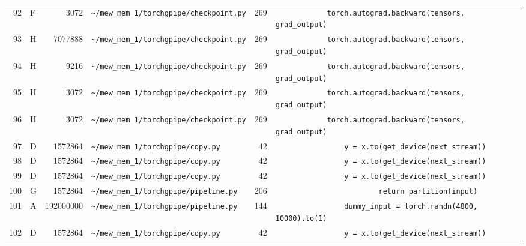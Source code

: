 \documentclass{article}
\begin{document}
\begin{longtable}{r l r p{6.5cm} r p{7.0cm}}
92 & F & 3072 & \lstinline|~/mew_mem_1/torchgpipe/checkpoint.py| & 269 & \lstinline|            torch.autograd.backward(tensors, grad_output)| \\
93 & H & 7077888 & \lstinline|~/mew_mem_1/torchgpipe/checkpoint.py| & 269 & \lstinline|            torch.autograd.backward(tensors, grad_output)| \\
94 & H & 9216 & \lstinline|~/mew_mem_1/torchgpipe/checkpoint.py| & 269 & \lstinline|            torch.autograd.backward(tensors, grad_output)| \\
95 & H & 3072 & \lstinline|~/mew_mem_1/torchgpipe/checkpoint.py| & 269 & \lstinline|            torch.autograd.backward(tensors, grad_output)| \\
96 & H & 3072 & \lstinline|~/mew_mem_1/torchgpipe/checkpoint.py| & 269 & \lstinline|            torch.autograd.backward(tensors, grad_output)| \\
97 & D & 1572864 & \lstinline|~/mew_mem_1/torchgpipe/copy.py| & 42 & \lstinline|                y = x.to(get_device(next_stream))| \\
98 & D & 1572864 & \lstinline|~/mew_mem_1/torchgpipe/copy.py| & 42 & \lstinline|                y = x.to(get_device(next_stream))| \\
99 & D & 1572864 & \lstinline|~/mew_mem_1/torchgpipe/copy.py| & 42 & \lstinline|                y = x.to(get_device(next_stream))| \\
100 & G & 1572864 & \lstinline|~/mew_mem_1/torchgpipe/pipeline.py| & 206 & \lstinline|                        return partition(input)| \\
101 & A & 192000000 & \lstinline|~/mew_mem_1/torchgpipe/pipeline.py| & 144 & \lstinline|                dummy_input = torch.randn(4800, 10000).to(1)| \\
102 & D & 1572864 & \lstinline|~/mew_mem_1/torchgpipe/copy.py| & 42 & \lstinline|                y = x.to(get_device(next_stream))| \\
\end{longtable}
\end{document}
